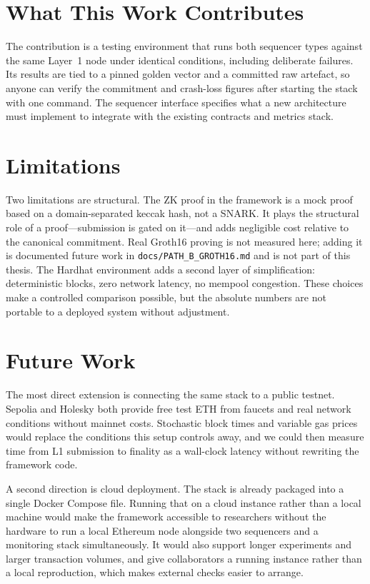 \section{What This Work Contributes}

The contribution is a testing environment that runs both sequencer types against the same Layer~1 node under identical conditions, including deliberate failures. Its results are tied to a pinned golden vector and a committed raw artefact, so anyone can verify the commitment and crash-loss figures after starting the stack with one command. The sequencer interface specifies what a new architecture must implement to integrate with the existing contracts and metrics stack.

\section{Limitations}

Two limitations are structural. The ZK proof in the framework is a mock proof based on a domain-separated keccak hash, not a SNARK. It plays the structural role of a proof---submission is gated on it---and adds negligible cost relative to the canonical commitment. Real Groth16 proving is not measured here; adding it is documented future work in \texttt{docs/PATH\_B\_GROTH16.md} and is not part of this thesis. The Hardhat environment adds a second layer of simplification: deterministic blocks, zero network latency, no mempool congestion. These choices make a controlled comparison possible, but the absolute numbers are not portable to a deployed system without adjustment.

\section{Future Work}

The most direct extension is connecting the same stack to a public testnet. Sepolia and Holesky both provide free test ETH from faucets and real network conditions without mainnet costs. Stochastic block times and variable gas prices would replace the conditions this setup controls away, and we could then measure time from L1 submission to finality as a wall-clock latency without rewriting the framework code.

A second direction is cloud deployment. The stack is already packaged into a single Docker Compose file. Running that on a cloud instance rather than a local machine would make the framework accessible to researchers without the hardware to run a local Ethereum node alongside two sequencers and a monitoring stack simultaneously. It would also support longer experiments and larger transaction volumes, and give collaborators a running instance rather than a local reproduction, which makes external checks easier to arrange.

